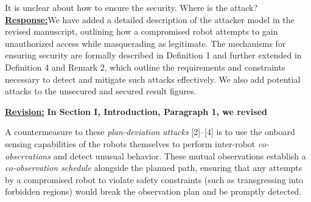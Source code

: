 \documentclass{article}
\newcommand{\re}{\tcblower \underline{\textbf{Response:}}\quad}
\newcommand{\rv}{{\large{\underline{\textbf{Revision:}}}}\quad}
\newcommand{\news}{\color{blue}}
\begin{document}
\begin{cmt}{}{}
	It is unclear about how to ensure the security. Where is the attack?
	\re We have added a detailed description of the attacker model in the revised manuscript, outlining how a compromised robot attempts to gain unauthorized access while masquerading as legitimate. The mechanisms for ensuring security are formally described in Definition 1 and further extended in Definition 4 and Remark 2, which outline the requirements and constraints necessary to detect and mitigate such attacks effectively. We also add potential attacks to the unsecured and secured result figures.
\end{cmt}
\rv 
\textbf{In Section I, Introduction, Paragraph 1, we revised}

{\news A countermeasure to these \emph{plan-deviation attacks} [2]–[4] is to use the onboard sensing capabilities of the robots themselves to perform inter-robot \emph{co-observations} and detect unusual behavior. These mutual observations establish a \emph{co-observation schedule} alongside the planned path, ensuring that any attempts by a compromised robot to violate safety constraints (such as transgressing into forbidden regions) would break the observation plan and be promptly detected.}
\end{document}
